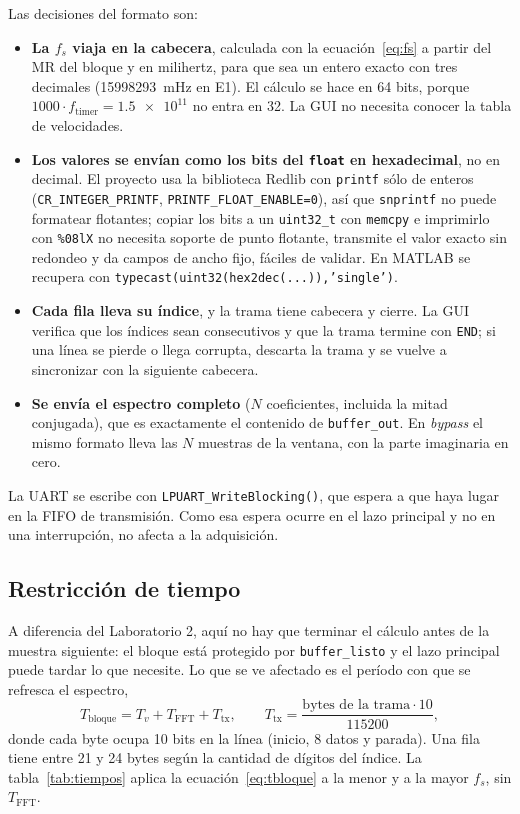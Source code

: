 \documentclass[11pt,a4paper]{article}
\begin{document}
Las decisiones del formato son:
\begin{itemize}
  \item \textbf{La $f_s$ viaja en la cabecera}, calculada con la
        ecuación~\eqref{eq:fs} a partir del MR del bloque y en milihertz,
        para que sea un entero exacto con tres decimales
        (\num{15998293}~mHz en E1). El cálculo se hace en 64 bits, porque
        $1000 \cdot f_{\text{timer}} = \num{1.5e11}$ no entra en 32. La GUI
        no necesita conocer la tabla de velocidades.
  \item \textbf{Los valores se envían como los bits del \texttt{float} en
        hexadecimal}, no en decimal. El proyecto usa la biblioteca Redlib
        con \texttt{printf} sólo de enteros (\texttt{CR\_INTEGER\_PRINTF},
        \texttt{PRINTF\_FLOAT\_ENABLE=0}), así que \texttt{snprintf} no
        puede formatear flotantes; copiar los bits a un \texttt{uint32\_t}
        con \texttt{memcpy} e imprimirlo con \verb|%08lX| no necesita
        soporte de punto flotante, transmite el valor exacto sin redondeo y
        da campos de ancho fijo, fáciles de validar. En MATLAB se recupera
        con \texttt{typecast(uint32(hex2dec(...)),'single')}.
  \item \textbf{Cada fila lleva su índice}, y la trama tiene cabecera y
        cierre. La GUI verifica que los índices sean consecutivos y que la
        trama termine con \texttt{END}; si una línea se pierde o llega
        corrupta, descarta la trama y se vuelve a sincronizar con la
        siguiente cabecera.
  \item \textbf{Se envía el espectro completo} ($N$ coeficientes, incluida la
        mitad conjugada), que es exactamente el contenido de
        \texttt{buffer\_out}. En \emph{bypass} el mismo formato lleva las
        $N$ muestras de la ventana, con la parte imaginaria en cero.
\end{itemize}

La UART se escribe con \texttt{LPUART\_WriteBlocking()}, que espera a que
haya lugar en la FIFO de transmisión. Como esa espera ocurre en el lazo
principal y no en una interrupción, no afecta a la adquisición.

\subsection{Restricción de tiempo}\label{sec:tiempos}

A diferencia del Laboratorio 2, aquí no hay que terminar el cálculo antes
de la muestra siguiente: el bloque está protegido por
\texttt{buffer\_listo} y el lazo principal puede tardar lo que necesite. Lo
que se ve afectado es el período con que se refresca el espectro,
\begin{equation}
  T_{\text{bloque}} = T_v + T_{\text{FFT}} + T_{\text{tx}},
  \qquad
  T_{\text{tx}} = \frac{\text{bytes de la trama} \cdot 10}{\num{115200}},
  \label{eq:tbloque}
\end{equation}
donde cada byte ocupa 10 bits en la línea (inicio, 8 datos y parada). Una
fila tiene entre 21 y 24 bytes según la cantidad de dígitos del índice. La
tabla~\ref{tab:tiempos} aplica la ecuación~\eqref{eq:tbloque} a la menor y a
la mayor $f_s$, sin $T_{\text{FFT}}$.
\end{document}
